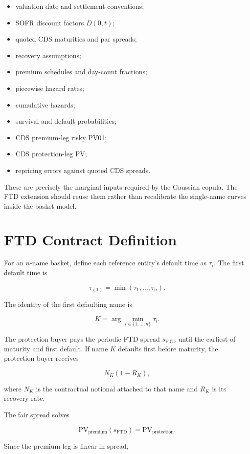\documentclass[11pt,a4paper]{article}
\newcommand{\FTD}{\mathrm{FTD}}
\newcommand{\PV}{\mathrm{PV}}
\begin{document}
\begin{itemize}
    \item valuation date and settlement conventions;
    \item SOFR discount factors $D(0,t)$;
    \item quoted CDS maturities and par spreads;
    \item recovery assumptions;
    \item premium schedules and day-count fractions;
    \item piecewise hazard rates;
    \item cumulative hazards;
    \item survival and default probabilities;
    \item CDS premium-leg risky PV01;
    \item CDS protection-leg PV;
    \item repricing errors against quoted CDS spreads.
\end{itemize}

These are precisely the marginal inputs required by the Gaussian copula. The FTD extension should reuse them rather than recalibrate the single-name curves inside the basket model.

\section{FTD Contract Definition}

For an $n$-name basket, define each reference entity's default time as $\tau_i$. The first default time is

\[
\tau_{(1)}
=
\min(\tau_1,\ldots,\tau_n).
\]

The identity of the first defaulting name is

\[
K
=
\arg\min_{i\in\{1,\ldots,n\}}\tau_i.
\]

The protection buyer pays the periodic FTD spread $s_{\FTD}$ until the earliest of maturity and first default. If name $K$ defaults first before maturity, the protection buyer receives

\[
N_K(1-R_K),
\]

where $N_K$ is the contractual notional attached to that name and $R_K$ is its recovery rate.

The fair spread solves

\[
\PV_{\mathrm{premium}}(s_{\FTD})
=
\PV_{\mathrm{protection}}.
\]

Since the premium leg is linear in spread,
\end{document}
